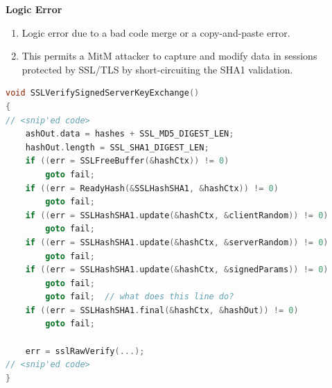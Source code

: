 \documentclass[12pt]{Training}
\begin{document}
\textbf{Logic Error}
\begin{enumerate}
    \item Logic error due to a bad code merge or a copy-and-paste error.
    \item This permits a MitM attacker to capture and modify data in sessions protected by SSL/TLS by short-circuiting the SHA1 validation.
\end{enumerate}
\begin{sectionbox}
\begin{lstlisting}[language=C, caption={Logic Error}]
void SSLVerifySignedServerKeyExchange()
{
// <snip'ed code>
    ashOut.data = hashes + SSL_MD5_DIGEST_LEN;
    hashOut.length = SSL_SHA1_DIGEST_LEN;
    if ((err = SSLFreeBuffer(&hashCtx)) != 0)
        goto fail;
    if ((err = ReadyHash(&SSLHashSHA1, &hashCtx)) != 0)
        goto fail;
    if ((err = SSLHashSHA1.update(&hashCtx, &clientRandom)) != 0)
        goto fail;
    if ((err = SSLHashSHA1.update(&hashCtx, &serverRandom)) != 0)
        goto fail;
    if ((err = SSLHashSHA1.update(&hashCtx, &signedParams)) != 0)
        goto fail;
        goto fail;  // what does this line do?
    if ((err = SSLHashSHA1.final(&hashCtx, &hashOut)) != 0)
        goto fail;

    err = sslRawVerify(...);
// <snip'ed code>
}
\end{lstlisting}
\end{sectionbox}
\end{document}
